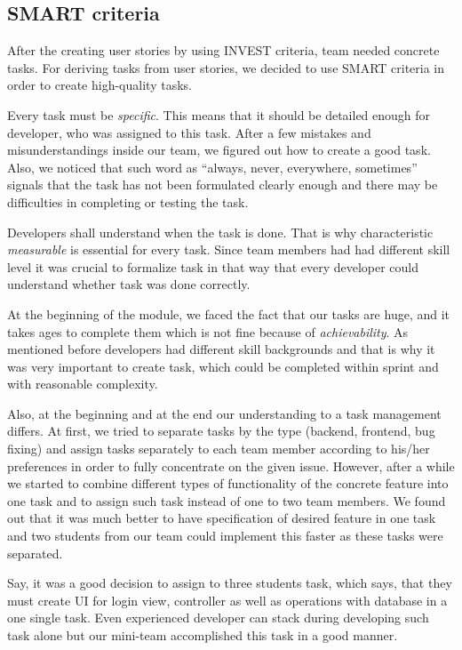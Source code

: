 \subsection{SMART criteria}
After the creating user stories by using INVEST criteria, team needed concrete tasks. For deriving tasks from user stories, we decided to use SMART criteria in order to create high-quality tasks. 

Every task must be \emph{specific}. This means that it should be detailed enough for developer, who was assigned to this task. After a few mistakes and misunderstandings inside our team, we figured out how to create a good task. Also, we noticed that such word as “always, never, everywhere, sometimes” signals that the task has not been formulated clearly enough and there may be difficulties in completing or testing the task. 

Developers shall understand when the task is done. That is why characteristic \emph{measurable} is essential for every task. Since team members had had different skill level it was crucial to formalize task in that way that every developer could understand whether task was done correctly. 

At the beginning of the module, we faced the fact that our tasks are huge, and it takes ages to complete them which is not fine because of  \emph{achievability}. As mentioned before developers had different skill backgrounds and that is why it was very important to create task, which could be completed within sprint and with reasonable complexity. 

Also, at the beginning and at the end our understanding to a task management differs. At first, we tried to separate tasks by the type (backend, frontend, bug fixing) and assign tasks separately to each team member according to his/her preferences in order to fully concentrate on the given issue. However, after a while we started to combine different types of functionality of the concrete feature into one task and to assign such task instead of one to two team members. We found out that it was much better to have specification of desired feature in one task and two students from our team could implement this faster as these tasks were separated. 

Say, it was a good decision to assign to three students task, which says, that they must create UI for login view, controller as well as operations with database in a one single task. Even experienced developer can stack during developing such task alone but our mini-team accomplished this task in a good manner.  

